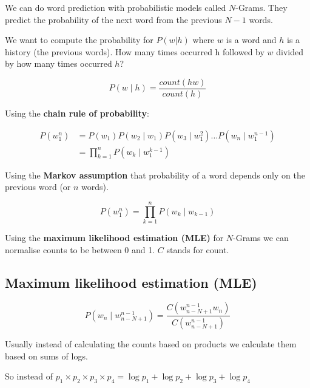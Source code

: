 We can do word prediction with probabilistic models called $N$-Grams. They predict the probability of the next word from the previous $N-1$ words.

We want to compute the probability for $P(w|h)$ where $w$ is a word and $h$ is a history (the previous words). How many times occurred h followed by $w$ divided by how many times occurred $h$?

\begin{equation}
  P(w \mid h) = \frac{count(hw)}{count(h)}
  \label{eq:Probwh}
\end{equation}

Using the \textbf{chain rule of probability}:

\begin{equation}
  \begin{split}
  P(w_1^n) &= P(w_1)P(w_2 \mid w_1)P(w_3 \mid w_1^2 ) \ldots P(w_n \mid w_1^{n-1})\\
  &= \prod_{k=1}^{n}P(w_k \mid w_1^{k-1})
  \end{split}
  \label{eq:Probw1n}
\end{equation}

Using the \textbf{Markov assumption} that probability of a word depends only on the previous word (or $n$ words).

\begin{equation}
  P(w_1^n) = \prod_{k=1}^{n}P(w_k \mid w_{k-1})
  \label{eq:Probw1n2}
\end{equation}

Using the \textbf{maximum likelihood estimation (MLE)} for $N$-Grams we can normalise counts to be between 0 and 1. $C$ stands for count.


\subsection*{Maximum likelihood estimation (MLE)}

\begin{equation}
  P(w_n \mid w_{n-N+1}^{n-1}) = \frac{C(w_{n-N+1}^{n-1} w_n)}{C(w_{n-N+1}^{n-1})}
  \label{eq:Probwnt}
\end{equation}

Usually instead of calculating the counts based on products we calculate them based on sums of logs.

So instead of  $p_1 \times p_2 \times p_3 \times p_4 = \log p_1 + \log p_2 + \log p_3 + \log p_4$

